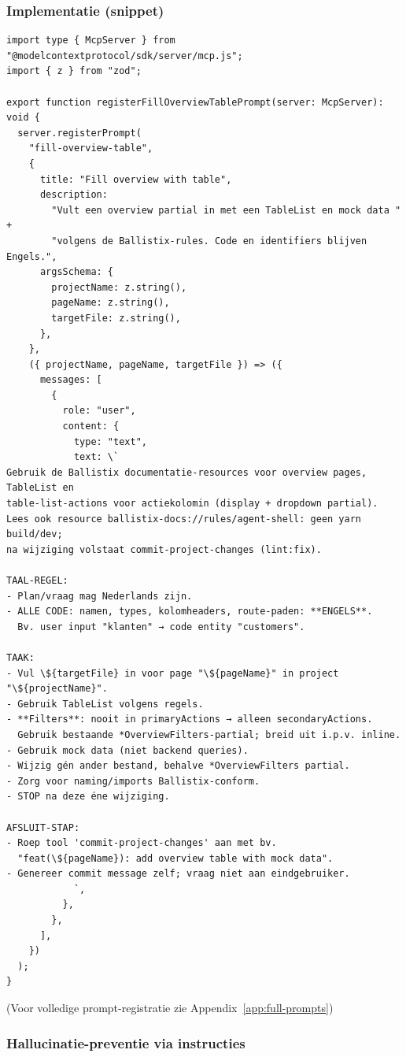 \subsubsection{Implementatie (snippet)}

\begin{verbatim}
import type { McpServer } from "@modelcontextprotocol/sdk/server/mcp.js";
import { z } from "zod";

export function registerFillOverviewTablePrompt(server: McpServer): void {
  server.registerPrompt(
    "fill-overview-table",
    {
      title: "Fill overview with table",
      description:
        "Vult een overview partial in met een TableList en mock data " +
        "volgens de Ballistix-rules. Code en identifiers blijven Engels.",
      argsSchema: {
        projectName: z.string(),
        pageName: z.string(),
        targetFile: z.string(),
      },
    },
    ({ projectName, pageName, targetFile }) => ({
      messages: [
        {
          role: "user",
          content: {
            type: "text",
            text: \`
Gebruik de Ballistix documentatie-resources voor overview pages, TableList en
table-list-actions voor actiekolomin (display + dropdown partial).
Lees ook resource ballistix-docs://rules/agent-shell: geen yarn build/dev;
na wijziging volstaat commit-project-changes (lint:fix).

TAAL-REGEL:
- Plan/vraag mag Nederlands zijn.
- ALLE CODE: namen, types, kolomheaders, route-paden: **ENGELS**.
  Bv. user input "klanten" → code entity "customers".

TAAK:
- Vul \${targetFile} in voor page "\${pageName}" in project "\${projectName}".
- Gebruik TableList volgens regels.
- **Filters**: nooit in primaryActions → alleen secondaryActions.
  Gebruik bestaande *OverviewFilters-partial; breid uit i.p.v. inline.
- Gebruik mock data (niet backend queries).
- Wijzig gén ander bestand, behalve *OverviewFilters partial.
- Zorg voor naming/imports Ballistix-conform.
- STOP na deze éne wijziging.

AFSLUIT-STAP:
- Roep tool 'commit-project-changes' aan met bv.
  "feat(\${pageName}): add overview table with mock data".
- Genereer commit message zelf; vraag niet aan eindgebruiker.
            `,
          },
        },
      ],
    })
  );
}
\end{verbatim}

\noindent
(Voor volledige prompt-registratie zie Appendix~\ref{app:full-prompts})

\subsubsection{Hallucinatie-preventie via instructies}

